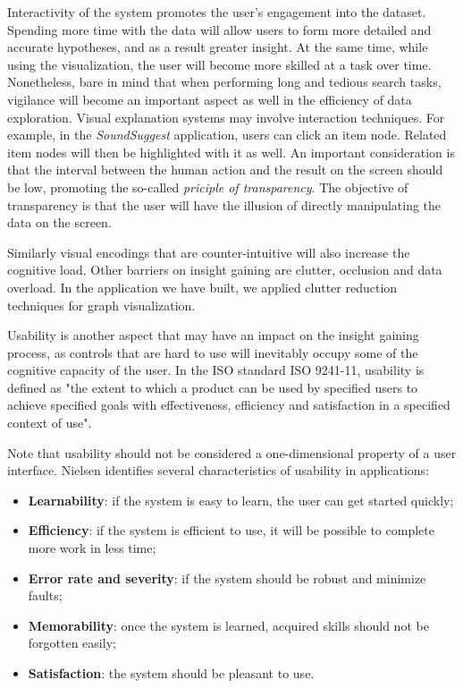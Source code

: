 
Interactivity of the system promotes the user's engagement into the dataset. Spending more time with the data will allow users to form more detailed and accurate hypotheses, and as a result greater insight\cite{yi:2008}. At the same time, while using the visualization, the user will become more skilled at a task over time. Nonetheless, bare in mind that when performing long and tedious search tasks, vigilance will become an important aspect as well in the efficiency of data exploration\cite{ware:2004}. Visual explanation systems may involve interaction techniques. For example, in the \emph{SoundSuggest} application, users can click an item node. Related item nodes will then be highlighted with it as well. An important consideration is that the interval between the human action and the result on the screen should be low, promoting the so-called \emph{priciple of transparency}. The objective of transparency is that the user will have the illusion of directly manipulating the data on the screen.

Similarly visual encodings that are counter-intuitive will also increase the cognitive load. Other barriers on insight gaining are clutter, occlusion and data overload\cite{yi:2008}. In the application we have built, we applied clutter reduction techniques for graph visualization.

Usability is another aspect that may have an impact on the insight gaining process, as controls that are hard to use will inevitably occupy some of the cognitive capacity of the user\cite{yi:2008}. In the ISO standard ISO 9241-11, usability is defined as "the extent to which a product can be used by specified users to achieve specified goals with effectiveness, efficiency and satisfaction in a specified context of use"\cite{usabilitynet:2006:standards}.

Note that usability should not be considered a one-dimensional property of a user interface. Nielsen identifies several characteristics of usability in applications\cite{nielsen:1993:UE:529793}:

\begin{itemize}
	\item \textbf{Learnability}: if the system is easy to learn, the user can get started quickly;
	\item \textbf{Efficiency}: if the system is efficient to use, it will be possible to complete more work in less time;
	\item \textbf{Error rate and severity}: if the system should be robust and minimize faults;
	\item \textbf{Memorability}: once the system is learned, acquired skills should not be forgotten easily;
	\item \textbf{Satisfaction}: the system should be pleasant to use.
\end{itemize}

